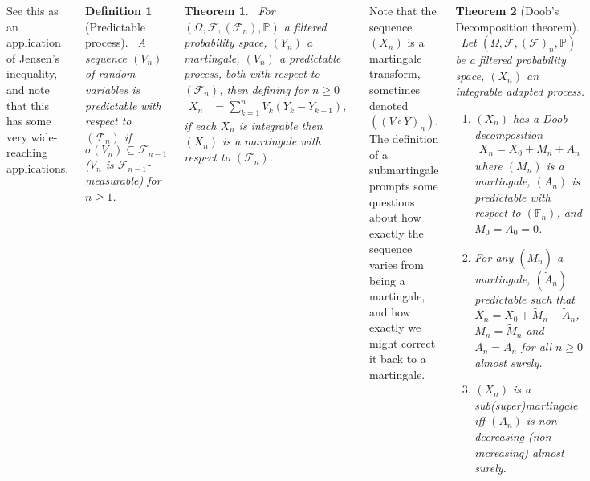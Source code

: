 \documentclass{tikzposter} %
\newtheorem{theorem}{Theorem}
\newtheorem{definition}{Definition}
\begin{document}
\begin{columns}
{    See this as an application of Jensen's inequality, and note that this has some very wide-reaching applications. \\

    \begin{definition}[Predictable process]
    \ A sequence $(V_{n})$ of random variables is predictable with respect to $(\mathcal{F}_{n})$ if $\sigma(V_{n}) \subseteq \mathcal{F}_{n-1}$ ($V_{n}$ is $\mathcal{F}_{n-1}$-measurable) for $n \ge 1$.
    \end{definition}
    \hphantom{}

    \begin{theorem}
    \ For $(\Omega, \mathcal{F}, (\mathcal{F}_{n}), \mathbb{P})$ a filtered probability space, $(Y_{n})$ a martingale, $(V_{n})$ a predictable process, both with respect to $(\mathcal{F}_{n})$, then defining for $n \ge 0$
    \begin{align*}
      X_{n} &= \sum_{k=1}^{n} V_{k}(Y_{k}-Y_{k-1}),
    \end{align*}
    if each $X_{n}$ is integrable then $(X_{n})$ is a martingale with respect to $(\mathcal{F}_{n})$.
    \end{theorem}
    \hphantom{}

    Note that the sequence $(X_{n})$ is a martingale transform, sometimes denoted $((V \circ Y)_{n})$. \\

    The definition of a submartingale prompts some questions about how exactly the sequence varies from being a martingale, and how exactly we might correct it back to a martingale. \\

    \begin{theorem}[Doob's Decomposition theorem]
    \ Let $(\Omega, \mathcal{F}, (\mathcal{F})_{n},\mathbb{P})$ be a filtered probability space, $(X_{n})$ an integrable adapted process.
    \begin{enumerate}[label=\roman*.]
            \item $(X_{n})$ has a Doob decomposition
            \begin{align*}
              X_{n} = X_{0} + M_{n} + A_{n}
            \end{align*}
            where $(M_{n})$ is a martingale, $(A_{n})$ is predictable with respect to $(\mathbb{F}_{n})$, and $M_{0} = A_{0} = 0$.
            \item For any $(\widetilde{M}_{n})$ a martingale, $(\widetilde{A}_{n})$ predictable such that $X_{n} = X_{0} + \widetilde{M}_{n} + \widetilde{A}_{n}$, $M_{n} = \widetilde{M}_{n}$ and $A_{n} = \widetilde{A}_{n}$ for all $n \ge 0$ almost surely.
            \item $(X_{n})$ is a sub(super)martingale iff $(A_{n})$ is non-decreasing (non-increasing) almost surely.
    \end{enumerate}
    \end{theorem}
    \hphantom{}

}
\end{columns}
\end{document}
